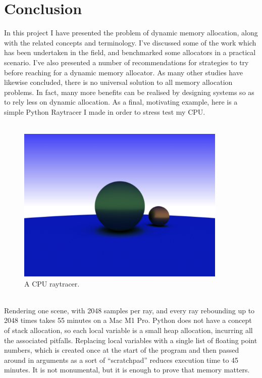 \documentclass{article}
\begin{document}
\section{Conclusion}
In this project I have presented the problem of dynamic memory allocation, along with the related concepts and terminology. I've discussed some of the work which has been undertaken in the field, and benchmarked some allocators in a practical scenario.  I've also presented a number of recommendations for strategies to try before reaching for a dynamic memory allocator. As many other studies have likewise concluded, there is no universal solution to all memory allocation problems. In fact, many more benefits can be realised by designing systems so as to rely less on dynamic allocation.
As a final, motivating example, here is a simple Python Raytracer I made in order to stress test my CPU.\\
\\
\begin{figure}[h]
	\centering
	\includegraphics[width=10cm]{raytrace}
	\captionsetup{width=10cm}
	\caption{A CPU raytracer.}
\end{figure}
\\
Rendering one scene, with 2048 samples per ray, and every ray rebounding up to 2048 times takes 55 minutes on a Mac M1 Pro. Python does not have a concept of stack allocation, so each local variable is a small heap allocation, incurring all the associated pitfalls. Replacing local variables with a single list of floating point numbers, which is created once at the start of the program and then passed around in arguments as a sort of ``scratchpad'' reduces execution time to 45 minutes. It is not monumental, but it is enough to prove that memory matters.

{}

\end{document}
